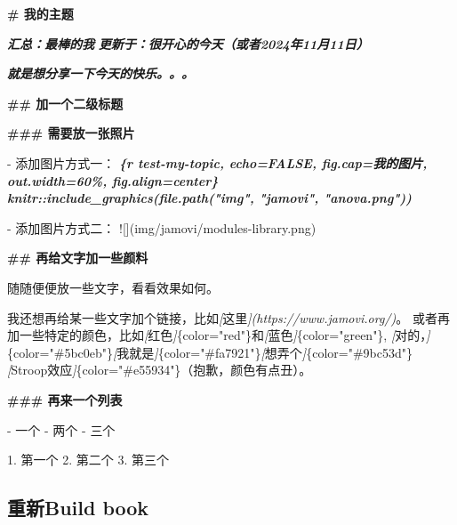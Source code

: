 \documentclass[]{ctexbook}
\newenvironment{Shaded}{\begin{snugshade}}{\end{snugshade}}
\newcommand{\AlertTok}[1]{\textcolor[rgb]{0.94,0.16,0.16}{#1}}
\newcommand{\CommentTok}[1]{\textcolor[rgb]{0.56,0.35,0.01}{\textit{#1}}}
\newcommand{\FunctionTok}[1]{\textcolor[rgb]{0.13,0.29,0.53}{\textbf{#1}}}
\newcommand{\InformationTok}[1]{\textcolor[rgb]{0.56,0.35,0.01}{\textbf{\textit{#1}}}}
\newcommand{\NormalTok}[1]{#1}
\newcommand{\OtherTok}[1]{\textcolor[rgb]{0.56,0.35,0.01}{#1}}
\newcommand{\SpecialStringTok}[1]{\textcolor[rgb]{0.31,0.60,0.02}{#1}}
\theoremstyle{definition}
\theoremstyle{definition}
\theoremstyle{definition}
\theoremstyle{definition}
\theoremstyle{remark}
\begin{document}
\begin{Shaded}
\begin{Highlighting}[]
\FunctionTok{\# 我的主题}

\InformationTok{    汇总：最棒的我     }
\InformationTok{    更新于：很开心的今天（或者2024年11月11日）}

\InformationTok{    就是想分享一下今天的快乐。。。}

\FunctionTok{\#\# 加一个二级标题}


\FunctionTok{\#\#\# 需要放一张照片}

\SpecialStringTok{{-} }\NormalTok{添加图片方式一：}
\InformationTok{\textasciigrave{}\textasciigrave{}\textasciigrave{}\{r test{-}my{-}topic, echo=FALSE, fig.cap=\textquotesingle{}我的图片\textquotesingle{}, out.width=\textquotesingle{}60\%\textquotesingle{}, fig.align=\textquotesingle{}center\textquotesingle{}\}}
\InformationTok{knitr::include\_graphics(file.path("img", "jamovi", "anova.png"))}
\InformationTok{\textasciigrave{}\textasciigrave{}\textasciigrave{}}

\SpecialStringTok{{-} }\NormalTok{添加图片方式二：}
\AlertTok{![](img/jamovi/modules{-}library.png)}

\FunctionTok{\#\# 再给文字加一些颜料}

\NormalTok{随随便便放一些文字，看看效果如何。}

\NormalTok{我还想再给某一些文字加个链接，比如}\CommentTok{[}\OtherTok{这里}\CommentTok{](https://www.jamovi.org/)}\NormalTok{。}
\NormalTok{或者再加一些特定的颜色，比如}\CommentTok{[}\OtherTok{红色}\CommentTok{]}\NormalTok{\{color="red"\}和}\CommentTok{[}\OtherTok{蓝色}\CommentTok{]}\NormalTok{\{color="green"\},}
\CommentTok{[}\OtherTok{对的，}\CommentTok{]}\NormalTok{\{color="\#5bc0eb"\}}\CommentTok{[}\OtherTok{我就是}\CommentTok{]}\NormalTok{\{color="\#fa7921"\}}\CommentTok{[}\OtherTok{想弄个}\CommentTok{]}\NormalTok{\{color="\#9bc53d"\}}
\CommentTok{[}\OtherTok{Stroop效应}\CommentTok{]}\NormalTok{\{color="\#e55934"\}（抱歉，颜色有点丑）。}

\FunctionTok{\#\#\# 再来一个列表}

\SpecialStringTok{{-} }\NormalTok{一个}
\SpecialStringTok{{-} }\NormalTok{两个}
\SpecialStringTok{{-} }\NormalTok{三个}

\SpecialStringTok{1. }\NormalTok{第一个}
\SpecialStringTok{2. }\NormalTok{第二个}
\SpecialStringTok{3. }\NormalTok{第三个}
\end{Highlighting}
\end{Shaded}

\subsection{重新Build book}\label{ux91cdux65b0build-book}
\end{document}
